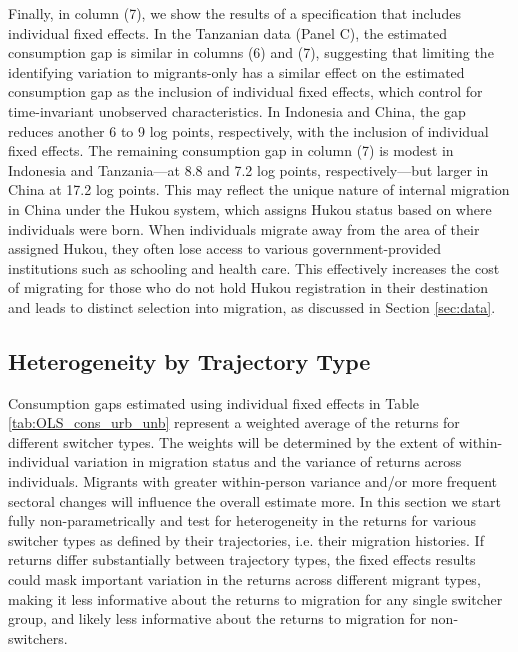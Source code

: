 Finally, in column (7), we show the results of a specification that includes individual fixed effects. 
In the Tanzanian data (Panel C), the estimated consumption gap is similar in columns (6) and (7), suggesting that limiting the identifying variation to migrants-only has a similar effect on the estimated consumption gap as the inclusion of individual fixed effects, which control for time-invariant unobserved characteristics. 
In Indonesia and China, the gap reduces another 6 to 9 log points, respectively, with the inclusion of individual fixed effects. 
The remaining consumption gap in column (7) is modest in Indonesia and Tanzania—at 8.8 and 7.2 log points, respectively—but larger in China at 17.2 log points. This may reflect the unique nature of internal migration in China under the Hukou system, which assigns Hukou status based on where individuals were born. When individuals migrate away from the area of their assigned Hukou, they often lose access to various government-provided institutions such as schooling and health care. This effectively increases the cost of migrating for those who do not hold Hukou registration in their destination and leads to distinct selection into migration, as discussed in Section \ref{sec:data}. 



\begin{landscape}
    
\end{landscape}

\subsection{Heterogeneity by Trajectory Type}\label{sec:heterogeneity}

Consumption gaps estimated using individual fixed effects in Table \ref{tab:OLS_cons_urb_unb} represent a weighted average of the returns for different switcher types. 
The weights will be determined by the extent of within-individual variation in migration status and the variance of returns across individuals.
Migrants with greater within-person variance and/or more frequent sectoral changes will influence the overall estimate more.
In this section we start fully non-parametrically and test for heterogeneity in the returns for various switcher types as defined by their trajectories, i.e. their migration histories. 
If returns differ substantially between trajectory types, the fixed effects results could mask important variation in the returns across different migrant types, making it less informative about the returns to migration for any single switcher group, and likely less informative about the returns to migration for non-switchers.

